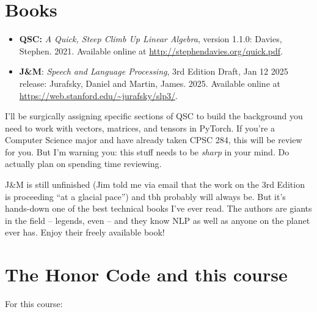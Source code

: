 \documentclass[12pt]{article}
\begin{document}
\section*{Books}

\begin{itemize}

\item \textbf{QSC:} \textit{A Quick, Steep Climb Up Linear Algebra}, version
1.1.0: Davies, Stephen. 2021. Available online at
\url{http://stephendavies.org/quick.pdf}.

\item \textbf{J\&M}: \textit{Speech and Language Processing}, 3rd Edition
Draft, Jan 12 2025 release: Jurafsky, Daniel and Martin, James. 2025. Available
online at \url{https://web.stanford.edu/~jurafsky/slp3/}.

\end{itemize}

I'll be surgically assigning specific sections of QSC to build the background
you need to work with vectors, matrices, and tensors in PyTorch. If you're a
Computer Science major and have already taken CPSC 284, this will be review for
you. But I'm warning you: this stuff needs to be \textit{sharp} in your mind.
Do actually plan on spending time reviewing.

J\&M is still unfinished (Jim told me via email that the work on the 3rd
Edition is proceeding ``at a glacial pace'') and tbh probably will always be.
But it's hands-down one of the best technical books I've ever read. The authors
are giants in the field -- legends, even -- and they know NLP as well as anyone
on the planet ever has. Enjoy their freely available book!

\section*{The Honor Code and this course}

For this course:
\end{document}
